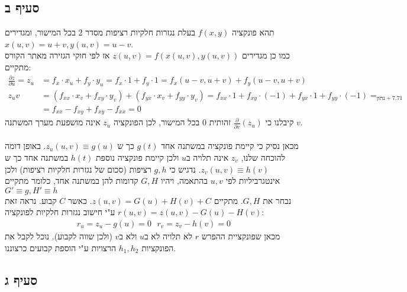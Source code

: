 \documentclass{article}
\DeclareMathOperator*{\equals}{=}
\begin{document}
\subsection*{סעיף ב}

תהא פונקציה $f(x,y)$ בעלת נגזרות חלקיות רציפות מסדר 2 בכל המישור, ומגדירים $x(u,v)=u+v, y(u,v)=u-v$. \\
כמו כן מגדירים $z(u,v)=f(x(u,v), y(u,v))$
אז לפי חוקי הגזירה מאתר הקורס מתקיים:
\begin{align*}
    \frac{\partial z}{\partial u}=z_u & = f_x \cdot x_u + f_y \cdot y_u =
    f_x \cdot 1 + f_y \cdot 1=f_x(u-v, u+v)+f_y(u-v, u+v)                                                                 \\
    z_uv                              & = (f_{xx} \cdot x_v + f_{xy} \cdot y_v) + (f_{yx} \cdot x_v + f_{yy} \cdot y_v) =
    f_{xx} \cdot 1 + f_{xy} \cdot (-1) + f_{yx} \cdot 1 + f_{yy} \cdot (-1) \equals_{\text{נתון} + 7.71}                  \\
                                      & = f_{xx} - f_{xy} + f_{xy} - f_{xx} = 0
\end{align*}
קיבלנו כי $\frac{\partial}{\partial v}(z_u)$ זהותית 0 בכל המישור, לכן הפונקציה $z_u$ אינה מושפעת מערך המשתנה $v$.\\\\
מכאן נסיק כי קיימת פונקציה במשתנה אחד $g(t)$ כך ש $z_u(u,v)\equiv g(u)$.
באופן דומה להוכחה שלנו, $z_v$ אינה תלויה ב$u$ ולכן קיימת פונקציה נוספת $h(t)$ במשתנה אחד כך ש $z_v(u,v)\equiv h(v)$. נדגיש כי $g,h$ רציפות (סכום של נגזרות חלקיות רציפות) ולכן אינטגרביליות לפי $u,v$ בהתאמה, ויהיו $G,H$ קדומות להן במשתנה אחד, כלומר מתקיים $G'\equiv g, H'\equiv h$\\
נבחר את $G,H$. מתקיים $z(u,v)=G(u)+H(v)+C$. כאשר $C$ קבוע. נראה זאת ע"י חישוב נגזרות חלקיות לפונקציה $r(u,v)=z(u,v)-G(u)-H(v)$:
\begin{align*}
    r_u=z_u-g(u)=0 \ \ \ r_v = z_v-h(v)=0
\end{align*}
מכאן שפונקציית ההפרש $r$ לא תלויה לא ב$u$ ולא ב$v$ (ולכן שווה לקבוע). נוכל לקבל את הפונקציות $h_1, h_2$ הרצויות ע"י הוספת קבועים כרצוננו.

\subsection*{סעיף ג}
\end{document}
